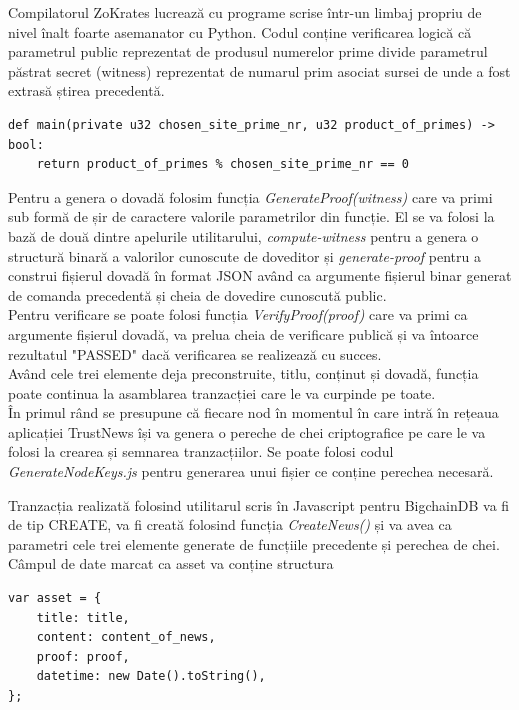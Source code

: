 Compilatorul ZoKrates lucrează cu programe scrise într-un limbaj propriu de nivel înalt foarte asemanator cu Python. Codul conține verificarea logică că parametrul public reprezentat de produsul numerelor prime divide parametrul păstrat secret (witness) reprezentat de numarul prim asociat sursei de unde a fost extrasă știrea precedentă.
\begin{verbatim}
def main(private u32 chosen_site_prime_nr, u32 product_of_primes) -> bool:
    return product_of_primes % chosen_site_prime_nr == 0
\end{verbatim}

Pentru a genera o dovadă folosim funcția \textit{GenerateProof(witness)} \cite{TrustNews_GenerateProof} care va primi sub formă de șir de caractere valorile parametrilor din funcție. El se va folosi la bază de două dintre apelurile utilitarului, \textit{compute-witness} pentru a genera o structură binară a valorilor cunoscute de doveditor și \textit{generate-proof} pentru a construi fișierul dovadă în format JSON având ca argumente fișierul binar generat de comanda precedentă și cheia de dovedire cunoscută public.\\

Pentru verificare se poate folosi funcția \textit{VerifyProof(proof)} \cite{TrustNews_VerifyProof} care va primi ca argumente fișierul dovadă, va prelua cheia de verificare publică și va întoarce rezultatul "PASSED" dacă verificarea se realizează cu succes.\\

Având cele trei elemente deja preconstruite, titlu, conținut și dovadă, funcția poate continua la asamblarea tranzacției care le va curpinde pe toate.\\

În primul rând se presupune că fiecare nod în momentul în care intră în rețeaua aplicației TrustNews își va genera o pereche de chei criptografice pe care le va folosi la crearea și semnarea tranzacțiilor. Se poate folosi codul \textit{GenerateNodeKeys.js} \cite{TrustNews_GenerateNodeKeys} pentru generarea unui fișier ce conține perechea necesară.\\

\clearpage

Tranzacția realizată folosind utilitarul scris în Javascript pentru BigchainDB va fi de tip CREATE, va fi creată folosind funcția \textit{CreateNews()} \cite{TrustNews_CreateNews} și va avea ca parametri cele trei elemente generate de funcțiile precedente și perechea de chei. Câmpul de date marcat ca asset va conține structura 
\begin{verbatim}
var asset = {
    title: title,
    content: content_of_news,
    proof: proof,
    datetime: new Date().toString(),
};
\end{verbatim}\\

